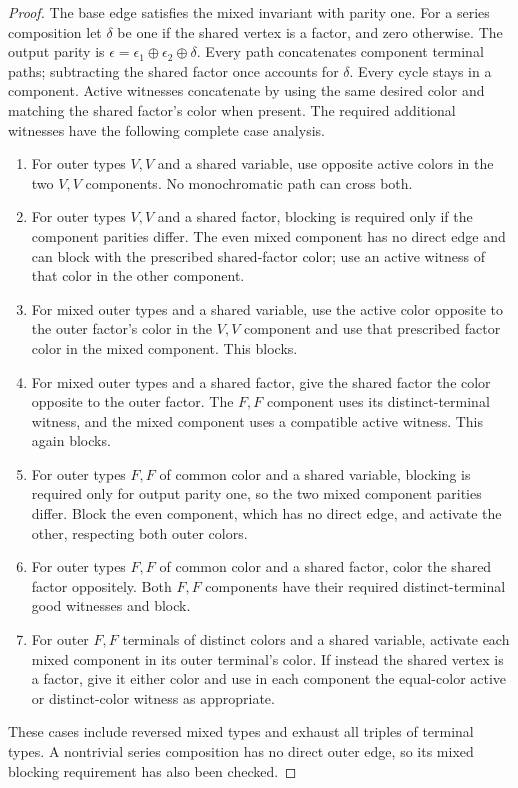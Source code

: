 \begin{proof}
The base edge satisfies the mixed invariant with parity one. For a
series composition let $\delta$ be one if the shared vertex is a factor,
and zero otherwise. The output parity is
$\epsilon=\epsilon_1\mathbin\oplus\epsilon_2\mathbin\oplus\delta$.
Every path concatenates component terminal paths; subtracting the
shared factor once accounts for $\delta$. Every cycle stays in a
component. Active witnesses concatenate by using the same desired color
and matching the shared factor's color when present. The required
additional witnesses have the following complete case analysis.
\begin{enumerate}
\item For outer types $V,V$ and a shared variable, use opposite active
colors in the two $V,V$ components. No monochromatic path can cross both.
\item For outer types $V,V$ and a shared factor, blocking is required
only if the component parities differ. The even mixed component has no
direct edge and can block with the prescribed shared-factor color;
use an active witness of that color in the other component.
\item For mixed outer types and a shared variable, use the active color
opposite to the outer factor's color in the $V,V$ component and use
that prescribed factor color in the mixed component. This blocks.
\item For mixed outer types and a shared factor, give the shared factor
the color opposite to the outer factor. The $F,F$ component uses its
distinct-terminal witness, and the mixed component uses a compatible
active witness. This again blocks.
\item For outer types $F,F$ of common color and a shared variable,
blocking is required only for output parity one, so the two mixed
component parities differ. Block the even component, which has no
direct edge, and activate the other, respecting both outer colors.
\item For outer types $F,F$ of common color and a shared factor, color
the shared factor oppositely. Both $F,F$ components have their required
distinct-terminal good witnesses and block.
\item For outer $F,F$ terminals of distinct colors and a shared
variable, activate each mixed component in its outer terminal's color.
If instead the shared vertex is a factor, give it either color and use
in each component the equal-color active or distinct-color witness
as appropriate.
\end{enumerate}
These cases include reversed mixed types and exhaust all triples of
terminal types. A nontrivial series composition has no direct outer edge,
so its mixed blocking requirement has also been checked.


\end{proof}
